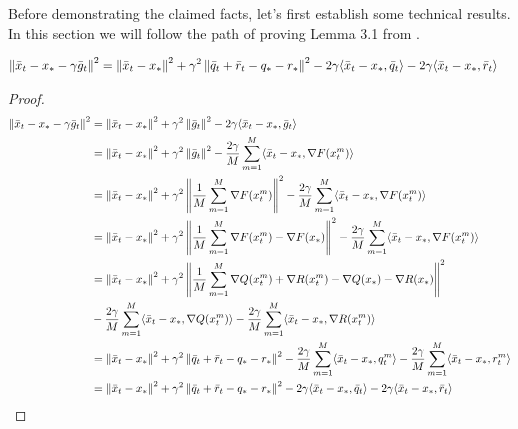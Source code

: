 
Before demonstrating the claimed facts, let's first establish some technical results.
In this section we will follow the path of proving Lemma 3.1 from \cite{Stich}.

\begin{lemma} \label{lem:lem_1}
    \begin{align*}
        \norm{\bar{x}_t - x_* - \gamma \bar{g}_t}^2
        &= \norm{\bar{x}_t - x_*}^2 
        + \gamma^2 \norm{\bar{q}_t 
        + \bar{r}_t - q_* - r_*}^2 
        - 2 \gamma \inner{\bar{x}_t - x_*}{\bar{q}_t}
        - 2 \gamma \inner{\bar{x}_t - x_*}{\bar{r}_t} 
    \end{align*}
\begin{proof}
    \begin{align*}
        \norm{\bar{x}_t - x_* - \gamma \bar{g}_t}^2
        &= 
        \norm{\bar{x}_t - x_*}^2 
        + \gamma^2 \norm{\bar{g}_t}^2 
        - 2 \gamma \inner{\bar{x}_t - x_*}{\bar{g}_t} \\
        &= 
        \norm{\bar{x}_t - x_*}^2 
        + \gamma^2 \norm{\bar{g}_t}^2 
        - \frac{2\gamma}{M} \summ {m=1}{M}{ \inner{\bar{x}_t - x_*}{\nabla F(x^m_t)} } \\
        &= 
        \norm{\bar{x}_t - x_*}^2 
        + \gamma^2 \norm{\fsumm {m=1}{M}{\nabla F(x^m_t)}}^2 
        - \frac{2\gamma}{M} \summ {m=1}{M}{ \inner{\bar{x}_t - x_*}{\nabla F(x^m_t)} } \\
        &= 
            \notag
        \norm{\bar{x}_t - x_*}^2 
        + \gamma^2 \norm{\fsumm {m=1}{M}{\nabla F(x^m_t)} - \nabla F(x_*)}^2 
        - \frac{2\gamma}{M} \summ {m=1}{M}{ \inner{\bar{x}_t - x_*}{\nabla F(x^m_t)} } \\
        &= 
            \notag
        \norm{\bar{x}_t - x_*}^2 
        + \gamma^2 \norm{\fsumm {m=1}{M}{\nabla Q(x^m_t) + \nabla R(x^m_t) - \nabla Q(x_*) - \nabla R(x_*)}}^2  \\
        &- \frac{2\gamma}{M} \summ {m=1}{M}{ \inner{\bar{x}_t - x_*}{\nabla Q(x^m_t)} }
        - \frac{2\gamma}{M} \summ {m=1}{M}{ \inner{\bar{x}_t - x_*}{\nabla R(x^m_t)} }  \\
        &= 
        \norm{\bar{x}_t - x_*}^2 
        + \gamma^2 \norm{\bar{q}_t 
        + \bar{r}_t - q_* - r_*}^2  
        - \frac{2\gamma}{M} \summ {m=1}{M}{ \inner{\bar{x}_t - x_*}{q^m_t} }
        - \frac{2\gamma}{M} \summ {m=1}{M} { \inner{\bar{x}_t - x_*}{r^m_t} } \\
        &= 
        \norm{\bar{x}_t - x_*}^2 
        + \gamma^2 \norm{\bar{q}_t 
        + \bar{r}_t - q_* - r_*}^2 
        - 2 \gamma \inner{\bar{x}_t - x_*}{\bar{q}_t}
        - 2 \gamma \inner{\bar{x}_t - x_*}{\bar{r}_t} 
    \end{align*}
\end{proof}
\end{lemma}

